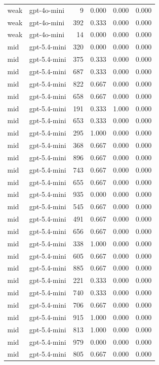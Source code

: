 \begin{tabular}{llrrrr}
weak & gpt-4o-mini & 9 & 0.000 & 0.000 & 0.000 \\
weak & gpt-4o-mini & 392 & 0.333 & 0.000 & 0.000 \\
weak & gpt-4o-mini & 14 & 0.000 & 0.000 & 0.000 \\
mid & gpt-5.4-mini & 320 & 0.000 & 0.000 & 0.000 \\
mid & gpt-5.4-mini & 375 & 0.333 & 0.000 & 0.000 \\
mid & gpt-5.4-mini & 687 & 0.333 & 0.000 & 0.000 \\
mid & gpt-5.4-mini & 822 & 0.667 & 0.000 & 0.000 \\
mid & gpt-5.4-mini & 658 & 0.667 & 0.000 & 0.000 \\
mid & gpt-5.4-mini & 191 & 0.333 & 1.000 & 0.000 \\
mid & gpt-5.4-mini & 653 & 0.333 & 0.000 & 0.000 \\
mid & gpt-5.4-mini & 295 & 1.000 & 0.000 & 0.000 \\
mid & gpt-5.4-mini & 368 & 0.667 & 0.000 & 0.000 \\
mid & gpt-5.4-mini & 896 & 0.667 & 0.000 & 0.000 \\
mid & gpt-5.4-mini & 743 & 0.667 & 0.000 & 0.000 \\
mid & gpt-5.4-mini & 655 & 0.667 & 0.000 & 0.000 \\
mid & gpt-5.4-mini & 935 & 0.000 & 0.000 & 0.000 \\
mid & gpt-5.4-mini & 545 & 0.667 & 0.000 & 0.000 \\
mid & gpt-5.4-mini & 491 & 0.667 & 0.000 & 0.000 \\
mid & gpt-5.4-mini & 656 & 0.667 & 0.000 & 0.000 \\
mid & gpt-5.4-mini & 338 & 1.000 & 0.000 & 0.000 \\
mid & gpt-5.4-mini & 605 & 0.667 & 0.000 & 0.000 \\
mid & gpt-5.4-mini & 885 & 0.667 & 0.000 & 0.000 \\
mid & gpt-5.4-mini & 221 & 0.333 & 0.000 & 0.000 \\
mid & gpt-5.4-mini & 740 & 0.333 & 0.000 & 0.000 \\
mid & gpt-5.4-mini & 706 & 0.667 & 0.000 & 0.000 \\
mid & gpt-5.4-mini & 915 & 1.000 & 0.000 & 0.000 \\
mid & gpt-5.4-mini & 813 & 1.000 & 0.000 & 0.000 \\
mid & gpt-5.4-mini & 979 & 0.000 & 0.000 & 0.000 \\
mid & gpt-5.4-mini & 805 & 0.667 & 0.000 & 0.000 \\

\end{tabular}

